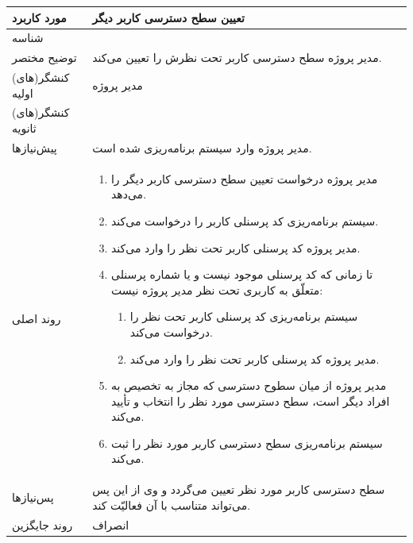 \begin{table}[H]
	\centering
	\begin{tabular}{|p{3cm}|p{10cm}|}
		\hline
		مورد کاربرد & تعیین سطح دسترسی کاربر دیگر  \\
		\hline
		شناسه & 
		\stepcounter{usecase_ID}
		\arabic{usecase_ID} \\
		\hline
		توضیح مختصر & مدیر پروژه سطح دسترسی کاربر تحت نظرش را تعیین می‌کند. \\
		\hline
		کنشگر(های) اولیه & مدیر پروژه \\
		\hline
		کنشگر(های) ثانویه &  \\
		\hline
		پیش‌نیازها & مدیر پروژه وارد سیستم برنامه‌ریزی شده است. \\
		\hline
		
		روند اصلی &
		\begin{enumerate}[topsep=0cm,leftmargin=0.5cm]
			\item مدیر پروژه درخواست تعیین سطح دسترسی کاربر دیگر را می‌دهد. 
			\item سیستم برنامه‌ریزی کد پرسنلی کاربر را درخواست می‌کند. 
			\item مدیر پروژه کد پرسنلی کاربر تحت نظر را وارد می‌کند. 
			\item تا زمانی که کد پرسنلی موجود نیست و یا شماره پرسنلی متعلّق به کاربری تحت نظر مدیر پروژه نیست: 
			\begin{enumerate}[topsep=0cm,leftmargin=0.5cm]
				\item سیستم برنامه‌ریزی کد پرسنلی کاربر تحت نظر را درخواست می‌کند.
				\item مدیر پروژه کد پرسنلی کاربر تحت نظر را وارد می‌کند.
			\end{enumerate} 
			\item مدیر پروژه از میان سطوح دسترسی که مجاز به تخصیص به افراد دیگر است، سطح دسترسی مورد نظر را انتخاب و تأیید می‌کند. 
			\item سیستم برنامه‌ریزی سطح دسترسی کاربر مورد نظر را ثبت می‌کند. 
		\end{enumerate} \\
		\hline
		
		پس‌نیازها & سطح دسترسی کاربر مورد نظر تعیین می‌گردد و وی از این پس می‌تواند متناسب با آن فعالیّت کند. \\
		\hline
		روند جایگزین & انصراف \\
		\hline
	\end{tabular}
\end{table}

